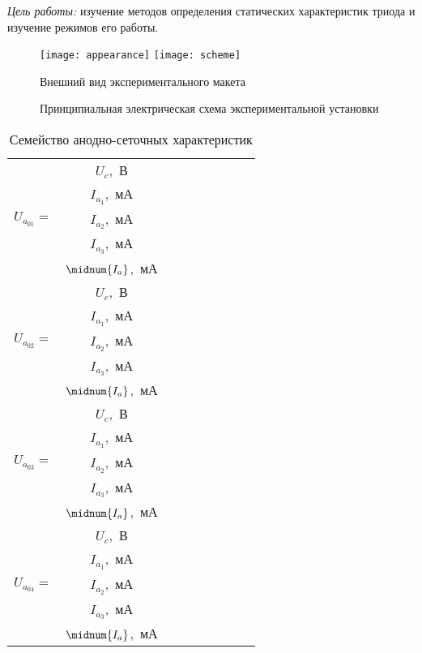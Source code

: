 \documentclass[10pt,pscyr,nonums]{hedlabwork}
\begin{document}
  \makeheader

  \emph{Цель работы:} изучение методов определения статических характеристик
  триода и изучение режимов его работы.
  
  \begin{figure}[h!]
    \center
    \texttt{[image: appearance]} \hspace*{2em}
    \texttt{[image: scheme]}
    \parbox{.45\textwidth}{\caption{Внешний вид экспериментального макета}}
    \hspace*{2em}
    \parbox{.4\textwidth}{\caption{Принципиальная электрическая схема
    экспериментальной установки}}
  \end{figure}
  
  \begin{table}[h!]
    \center
    \caption{Семейство анодно-сеточных характеристик}
    \begin{tabular}{|m{}|*{8}{C{.07}|}} \hline
     & \( U_c \),~В &
      &&&&&& \\ 
    & \( I_{a_1} \),~мА &
      &&&&&& \\ 
    & \( I_{a_2} \),~мА &
      &&&&&& \\ 
    & \( I_{a_3} \),~мА &
      &&&&&& \\ 
    & \( \midnum{I_a} \),~мА &
      &&&&&& \\ \hline
     & \( U_c \),~В &
      &&&&&& \\ 
    & \( I_{a_1} \),~мА &
      &&&&&& \\ 
    & \( I_{a_2} \),~мА &
      &&&&&& \\ 
    & \( I_{a_3} \),~мА &
      &&&&&& \\ 
    & \( \midnum{I_a} \),~мА &
      &&&&&& \\ \hline
     & \( U_c \),~В &
      &&&&&& \\ 
    & \( I_{a_1} \),~мА &
      &&&&&& \\ 
    & \( I_{a_2} \),~мА &
      &&&&&& \\ 
    & \( I_{a_3} \),~мА &
      &&&&&& \\ 
    & \( \midnum{I_a} \),~мА &
      &&&&&& \\ \hline
     & \( U_c \),~В &
      &&&&&& \\ 
    & \( I_{a_1} \),~мА &
      &&&&&& \\ 
    & \( I_{a_2} \),~мА &
      &&&&&& \\ 
    & \( I_{a_3} \),~мА &
      &&&&&& \\ 
    & \( \midnum{I_a} \),~мА &
      &&&&&& \\ \hline
    \end{tabular}
  \end{table}
  
\end{document}
